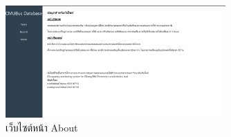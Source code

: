   \begin{figure}[h!]
    \begin{center}
      \includegraphics[width=0.75\textwidth]{about.png}
    \end{center}
    \caption[Poem]{เว็บไซต์หน้า About}
    \label{fig:about}
  \end{figure}






